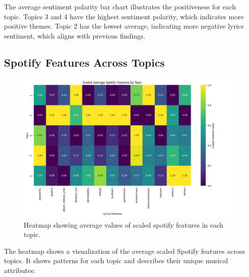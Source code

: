 The average sentiment polarity bar chart illustrates the positiveness for each
topic. Topics 3 and 4 have the highest sentiment polarity, which indicates more
positive themes. Topic 2 has the lowest average, indicating more negative
lyrics sentiment, which aligns with previous findings.

\subsection{Spotify Features Across Topics}

\begin{center}
\begin{figure}[H]
  \centering
  \includegraphics[width=5in]{img/lda_spotify_features.png}
  \caption{Heatmap showing average values of scaled spotify features in each
  topic.}
  \label{Figure:fig_eh}
\end{figure}
\end{center}

The heatmap shows a visualization of the average scaled Spotify features
across topics. It shows patterns for each topic and describes their
unique musical attributes:

